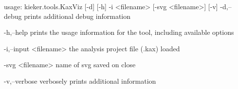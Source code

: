 usage: kieker.tools.KaxViz [-d] [-h] -i <filename> [-svg <filename>] [-v]
 -d,--debug
        prints additional debug information

 -h,--help
        prints the usage information for the tool, including available
        options

 -i,--input <filename>
        the analysis project file (.kax) loaded

 -svg <filename>
        name of svg saved on close

 -v,--verbose
        verbosely prints additional information